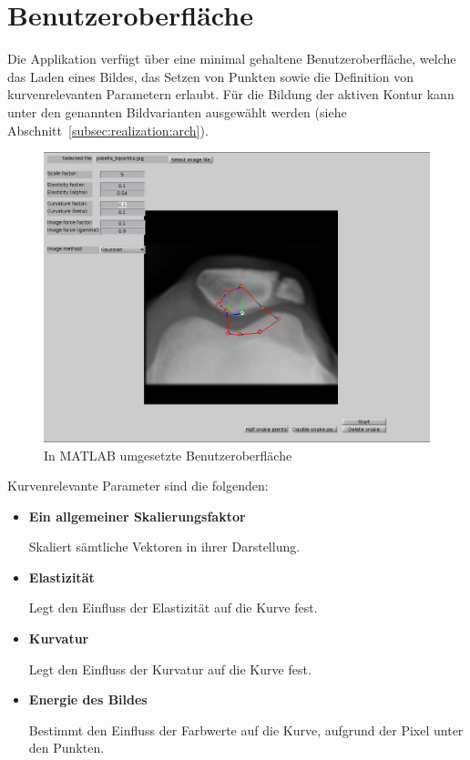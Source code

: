 \section{Benutzeroberfläche}
\label{sec:realisation:gui}
Die Applikation verfügt über eine minimal gehaltene Benutzeroberfläche, welche das Laden eines Bildes, das Setzen von Punkten sowie die Definition von kurvenrelevanten Parametern erlaubt. Für die Bildung der aktiven Kontur kann unter den genannten Bildvarianten ausgewählt werden (siehe Abschnitt~\ref{subsec:realization:arch}).
\setcounter{figure}{1}
\begin{figure}[h!]
    \centering
    \includegraphics[scale=0.5]{images/ownimpl_gui.png}
    \caption{In MATLAB umgesetzte Benutzeroberfläche\protect\footnotemark{}}
\label{fig:ownimpl_gui}
\end{figure}

\newpage

Kurvenrelevante Parameter sind die folgenden:
\begin{itemize}
    \item \textbf{Ein allgemeiner Skalierungsfaktor}

        Skaliert sämtliche Vektoren in ihrer Darstellung.

    \item \textbf{Elastizität}

        Legt den Einfluss der Elastizität auf die Kurve fest.

    \item \textbf{Kurvatur}

        Legt den Einfluss der Kurvatur auf die Kurve fest.

    \item \textbf{Energie des Bildes}

        Bestimmt den Einfluss der Farbwerte auf die Kurve, aufgrund der Pixel unter den Punkten.
\end{itemize}

